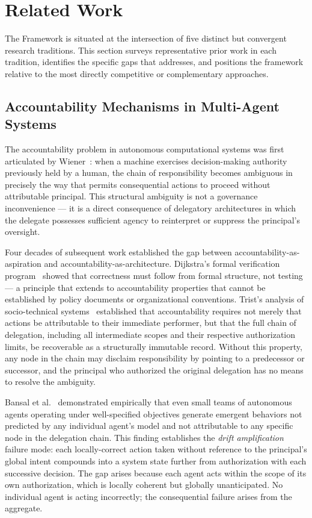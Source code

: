 \section{Related Work}\label{sec:related}

The \bxthree{} Framework is situated at the intersection of five distinct but convergent research traditions. This section surveys representative prior work in each tradition, identifies the specific gaps that \bxthree{} addresses, and positions the framework relative to the most directly competitive or complementary approaches.

\subsection{Accountability Mechanisms in Multi-Agent Systems}

The accountability problem in autonomous computational systems was first articulated by Wiener~\cite{wiener1948}: when a machine exercises decision-making authority previously held by a human, the chain of responsibility becomes ambiguous in precisely the way that permits consequential actions to proceed without attributable principal. This structural ambiguity is not a governance inconvenience --- it is a direct consequence of delegatory architectures in which the delegate possesses sufficient agency to reinterpret or suppress the principal's oversight.

Four decades of subsequent work established the gap between accountability-as-aspiration and accountability-as-architecture. Dijkstra's formal verification program~\cite{dijkstra1982} showed that correctness must follow from formal structure, not testing --- a principle that extends to accountability properties that cannot be established by policy documents or organizational conventions. Trist's analysis of socio-technical systems~\cite{tristr81} established that accountability requires not merely that actions be attributable to their immediate performer, but that the full chain of delegation, including all intermediate scopes and their respective authorization limits, be recoverable as a structurally immutable record. Without this property, any node in the chain may disclaim responsibility by pointing to a predecessor or successor, and the principal who authorized the original delegation has no means to resolve the ambiguity.

Bansal et al.\ \cite{bansal2019} demonstrated empirically that even small teams of autonomous agents operating under well-specified objectives generate emergent behaviors not predicted by any individual agent's model and not attributable to any specific node in the delegation chain. This finding establishes the \textit{drift amplification} failure mode: each locally-correct action taken without reference to the principal's global intent compounds into a system state further from authorization with each successive decision. The gap arises because each agent acts within the scope of its own authorization, which is locally coherent but globally unanticipated. No individual agent is acting incorrectly; the consequential failure arises from the aggregate.

